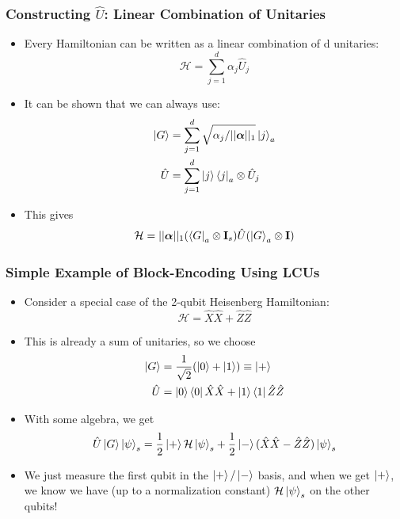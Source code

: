 \documentclass[aspectratio=169]{beamer}
\begin{document}
\begin{frame}
	\frametitle{Constructing $\hat{U}$: Linear Combination of Unitaries}
	\begin{itemize}[<+->]
		\item Every Hamiltonian can be written as a linear combination of d unitaries:
		\begin{equation}\nonumber
		\mathcal{H} = \sum_{j=1}^d \alpha_j \hat{U}_j
		\end{equation}
		\item It can be shown that we can always use:
		\begin{align}
			\nonumber \ket{G} &= \sum_{j=1}^d\sqrt{\alpha_j/||\boldsymbol{\alpha}||_1}\ket{j}_a\\
			\nonumber \hat{U} &= \sum_{j=1}^d\ket{j}\bra{j}_a\otimes\hat{U}_j
		\end{align}
		\item This gives 
		\begin{equation}
			\mathcal{H} = ||\boldsymbol{\alpha}||_1(\bra{G}_a\otimes \mathbf{I}_s)\hat{U}(\ket{G}_a\otimes\mathbf{I})
		\end{equation}
	\end{itemize}
\end{frame}

\begin{frame}
	\frametitle{Simple Example of Block-Encoding Using LCUs}
	\begin{itemize}[<+->]
	\item Consider a special case of the 2-qubit Heisenberg Hamiltonian:
	\begin{equation}\nonumber
		\mathcal{H} = \hat{X}\hat{X}+\hat{Z}\hat{Z}
	\end{equation}
	\item This is already a sum of unitaries, so we choose
	\begin{align}
	\nonumber \ket{G} &= \frac{1}{\sqrt{2}}(\ket{0}+\ket{1})\equiv{\ket{+}}\\
	\nonumber \hat{U} &= \ket{0}\bra{0}\hat{X}\hat{X}+\ket{1}\bra{1}\hat{Z}\hat{Z}
	\end{align}
	\item With some algebra, we get
	\begin{equation} \nonumber
		\hat{U}\ket{G}\ket{\psi}_s = \frac{1}{2}\ket{+}\mathcal{H}\ket{\psi}_s + \frac{1}{2}\ket{-}(\hat{X}\hat{X}-\hat{Z}\hat{Z})\ket{\psi}_s
	\end{equation}
	\item We just measure the first qubit in the $\ket{+}/\ket{-}$ basis, and when we get $\ket{+}$, we know we have (up to a normalization constant) $\mathcal{H}\ket{\psi}_s$ on the other qubits!
	\end{itemize}
\end{frame}
\end{document}
